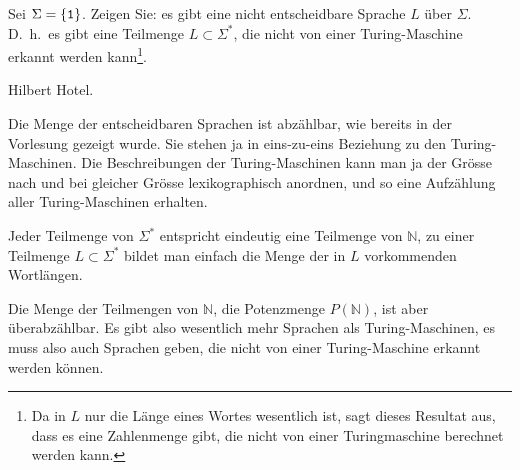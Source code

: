 Sei $\Sigma=\{{\tt 1}\}$.
Zeigen Sie: es gibt eine nicht entscheidbare
Sprache $L$ über $\Sigma$.
D.~h.~es gibt eine Teilmenge $L\subset \Sigma^*$, die nicht
von einer Turing-Maschine erkannt werden kann\footnote{Da in $L$
nur die Länge eines Wortes wesentlich ist, sagt dieses Resultat
aus, dass es eine Zahlenmenge gibt, die nicht von einer Turingmaschine
berechnet werden kann.}.

\begin{hinweis}
Hilbert Hotel.
\end{hinweis}


\begin{loesung}
Die Menge der entscheidbaren Sprachen ist abzählbar, wie bereits in
der Vorlesung gezeigt wurde. Sie stehen ja
in eins-zu-eins Beziehung zu den Turing-Maschinen. Die Beschreibungen
der Turing-Maschinen kann man ja der Grösse nach und bei gleicher Grösse
lexikographisch anordnen, und so eine Auf\-zählung aller Turing-Maschinen
erhalten.

Jeder Teilmenge von $\Sigma^*$ entspricht eindeutig eine Teilmenge
von $\mathbb N$, zu einer Teilmenge $L\subset\Sigma^*$
bildet man einfach die Menge der in $L$ vorkommenden Wortlängen.

Die Menge der Teilmengen von $\mathbb N$, die Potenzmenge $P(\mathbb N)$,
ist aber überabzählbar.
Es gibt also wesentlich mehr Sprachen als Turing-Maschinen, es
muss also auch Sprachen geben, die nicht von einer Turing-Maschine
erkannt werden können.
\end{loesung}
